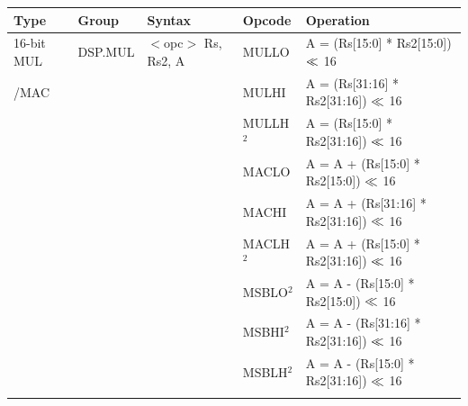 \clearpage
\begin{table}
\begin{subtable}{\linewidth}
\begin{center}
\scriptsize
\begin{tabular}{lllll}
\hline
Type               & Group             & Syntax                                & Opcode            & Operation                                                                     \\ \hline
16-bit MUL         & DSP.MUL           & $<$opc$>$ Rs, Rs2, A                  & MULLO             & A = (Rs[15:0] * Rs2[15:0]) $\ll$ 16                                          \\
/MAC               &                   &                                       & MULHI             & A = (Rs[31:16] * Rs2[31:16]) $\ll$ 16                                        \\
                   &                   &                                       & MULLH$^2$         & A = (Rs[15:0] * Rs2[31:16]) $\ll$ 16                                         \\
                   &                   &                                       & MACLO             & A = A + (Rs[15:0] * Rs2[15:0]) $\ll$ 16                                      \\
                   &                   &                                       & MACHI             & A = A + (Rs[31:16] * Rs2[31:16]) $\ll$ 16                                    \\
                   &                   &                                       & MACLH$^2$         & A = A + (Rs[15:0] * Rs2[31:16]) $\ll$ 16                                     \\
                   &                   &                                       & MSBLO$^2$         & A = A - (Rs[15:0] * Rs2[15:0]) $\ll$ 16                                      \\
                   &                   &                                       & MSBHI$^2$         & A = A - (Rs[31:16] * Rs2[31:16]) $\ll$ 16                                    \\
                   &                   &                                       & MSBLH$^2$         & A = A - (Rs[15:0] * Rs2[31:16]) $\ll$ 16                                     \\
                   &                   &                                       &                   &                                                                               \\

\end{tabular}
\end{center}
\end{subtable}
\end{table}
